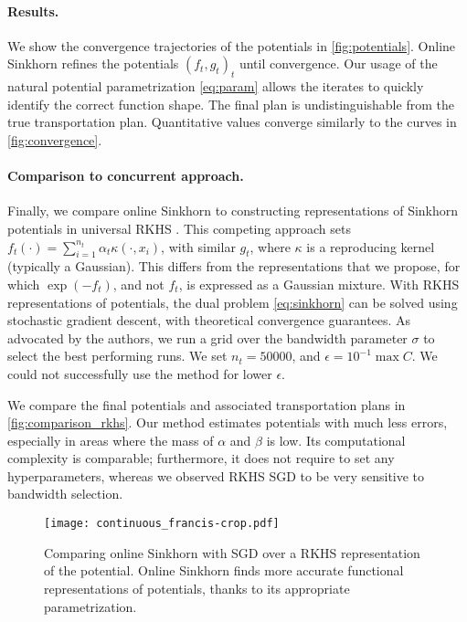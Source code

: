\paragraph{Results.} We show the convergence trajectories of the potentials in
\autoref{fig:potentials}. Online Sinkhorn refines the potentials $(f_t, g_t)_t$ until convergence. Our usage of the natural potential parametrization \eqref{eq:param}
allows the iterates to quickly identify the correct function shape. The final
plan is undistinguishable from the true transportation plan. Quantitative values
converge similarly to the curves in \autoref{fig:convergence}.

\paragraph{Comparison to concurrent approach.} Finally, we compare online
Sinkhorn to constructing representations of Sinkhorn potentials in universal
RKHS \cite{2016-genevay-nips}. This competing approach sets $f_t(\cdot) =
\sum_{i=1}^{n_t} \alpha_t \kappa(\cdot, x_i)$, with similar $g_t$, where $\kappa$ is
a reproducing kernel (typically a Gaussian). This differs from the
representations that we propose, for which $\exp(-f_t)$, and not $f_t$, is
expressed as a Gaussian mixture. With RKHS representations of potentials, the
dual problem \eqref{eq:sinkhorn} can be solved using stochastic gradient
descent, with theoretical convergence guarantees. As advocated by the authors,
we run a grid over the bandwidth parameter $\sigma$ to select the best
performing runs. We set $n_t = 50000$, and $\epsilon = 10^{-1} \max C$. We could not successfully use the method for lower $\epsilon$.

We compare the final potentials and associated
transportation plans in \autoref{fig:comparison_rkhs}. Our method estimates
potentials with much less errors, especially in areas where the mass of $\alpha$
and $\beta$ is low. Its computational complexity is comparable; furthermore, it
does not require to set any hyperparameters, whereas we observed RKHS SGD to be
very sensitive to bandwidth selection.

\begin{figure}[t]
    \centering
    \texttt{[image: continuous\_francis-crop.pdf]}
    \caption{Comparing online Sinkhorn with SGD over a RKHS representation of the potential. Online Sinkhorn finds more accurate functional representations of potentials, thanks to its appropriate parametrization.}
    \label{fig:comparison_rkhs}
\end{figure}
